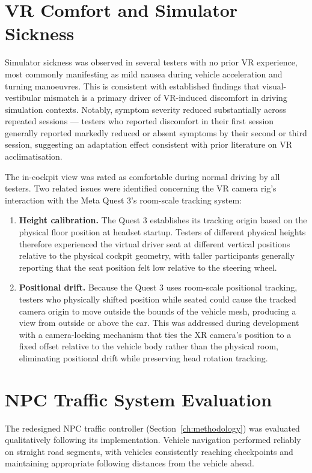 \section{VR Comfort and Simulator Sickness}

Simulator sickness was observed in several testers with no prior VR experience, most commonly manifesting as mild nausea during vehicle acceleration and turning manoeuvres. This is consistent with established findings that visual-vestibular mismatch is a primary driver of VR-induced discomfort in driving simulation contexts. Notably, symptom severity reduced substantially across repeated sessions — testers who reported discomfort in their first session generally reported markedly reduced or absent symptoms by their second or third session, suggesting an adaptation effect consistent with prior literature on VR acclimatisation.

The in-cockpit view was rated as comfortable during normal driving by all testers. Two related issues were identified concerning the VR camera rig's interaction with the Meta Quest 3's room-scale tracking system:

\begin{enumerate}
    \item \textbf{Height calibration.} The Quest 3 establishes its tracking origin based on the physical floor position at headset startup. Testers of different physical heights therefore experienced the virtual driver seat at different vertical positions relative to the physical cockpit geometry, with taller participants generally reporting that the seat position felt low relative to the steering wheel.
    \item \textbf{Positional drift.} Because the Quest 3 uses room-scale positional tracking, testers who physically shifted position while seated could cause the tracked camera origin to move outside the bounds of the vehicle mesh, producing a view from outside or above the car. This was addressed during development with a camera-locking mechanism that ties the XR camera's position to a fixed offset relative to the vehicle body rather than the physical room, eliminating positional drift while preserving head rotation tracking.
\end{enumerate}

\section{NPC Traffic System Evaluation}

The redesigned NPC traffic controller (Section~\ref{ch:methodology}) was evaluated qualitatively following its implementation. Vehicle navigation performed reliably on straight road segments, with vehicles consistently reaching checkpoints and maintaining appropriate following distances from the vehicle ahead. 

